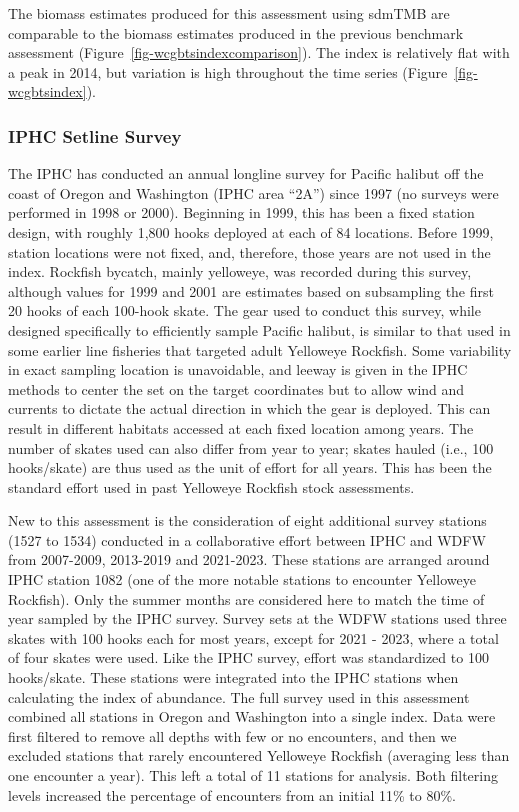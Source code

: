 \documentclass[
]{scrartcl}
\begin{document}
The biomass estimates produced for this assessment using sdmTMB are
comparable to the biomass estimates produced in the previous benchmark
assessment (Figure~\ref{fig-wcgbtsindexcomparison}). The index is
relatively flat with a peak in 2014, but variation is high throughout
the time series (Figure~\ref{fig-wcgbtsindex}).

\subsubsection{IPHC Setline Survey}\label{iphc-setline-survey}

The IPHC has conducted an annual longline survey for Pacific halibut off
the coast of Oregon and Washington (IPHC area ``2A'') since 1997 (no
surveys were performed in 1998 or 2000). Beginning in 1999, this has
been a fixed station design, with roughly 1,800 hooks deployed at each
of 84 locations. Before 1999, station locations were not fixed, and,
therefore, those years are not used in the index. Rockfish bycatch,
mainly yelloweye, was recorded during this survey, although values for
1999 and 2001 are estimates based on subsampling the first 20 hooks of
each 100-hook skate. The gear used to conduct this survey, while
designed specifically to efficiently sample Pacific halibut, is similar
to that used in some earlier line fisheries that targeted adult
Yelloweye Rockfish. Some variability in exact sampling location is
unavoidable, and leeway is given in the IPHC methods to center the set
on the target coordinates but to allow wind and currents to dictate the
actual direction in which the gear is deployed. This can result in
different habitats accessed at each fixed location among years. The
number of skates used can also differ from year to year; skates hauled
(i.e., 100 hooks/skate) are thus used as the unit of effort for all
years. This has been the standard effort used in past Yelloweye Rockfish
stock assessments.

New to this assessment is the consideration of eight additional survey
stations (1527 to 1534) conducted in a collaborative effort between IPHC
and WDFW from 2007-2009, 2013-2019 and 2021-2023. These stations are
arranged around IPHC station 1082 (one of the more notable stations to
encounter Yelloweye Rockfish). Only the summer months are considered
here to match the time of year sampled by the IPHC survey. Survey sets
at the WDFW stations used three skates with 100 hooks each for most
years, except for 2021 - 2023, where a total of four skates were used.
Like the IPHC survey, effort was standardized to 100 hooks/skate. These
stations were integrated into the IPHC stations when calculating the
index of abundance. The full survey used in this assessment combined all
stations in Oregon and Washington into a single index. Data were first
filtered to remove all depths with few or no encounters, and then we
excluded stations that rarely encountered Yelloweye Rockfish (averaging
less than one encounter a year). This left a total of 11 stations for
analysis. Both filtering levels increased the percentage of encounters
from an initial 11\% to 80\%.
\end{document}
